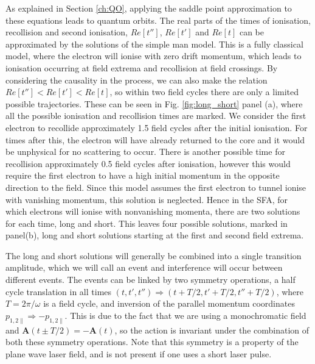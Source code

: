 \documentclass[11pt]{article}
\numberwithin{equation}{section}
\begin{document}
As explained in Section \ref{ch:QO}, applying the saddle point approximation to these equations leads to quantum orbits. The real parts of the times of ionisation, recollision and second ionisation, $Re[t'']$, $Re[t']$ and $Re[t]$ can be approximated by the solutions of the simple man model\cite{corkum_1993_plasma}. This is a fully classical model, where the electron will ionise with zero drift momentum, which leads to ionisation occurring at field extrema and recollision at field crossings. By considering the causality in the process, we can also make the relation $Re[t''] < Re[t'] < Re[t]$, so within two field cycles there are only a limited possible trajectories. These can be seen in Fig. \ref{fig:long_short} panel (a), where all the possible ionisation and recollision times are marked. We consider the first electron to recollide approximately 1.5 field cycles after the initial ionisation. For times after this, the electron will have already returned to the core and it would be unphysical for no scattering to occur. There is another possible time for recollision approximately 0.5 field cycles after ionisation, however this would require the first electron to have a high initial momentum in the opposite direction to the field. Since this model assumes the first electron to tunnel ionise with vanishing momentum, this solution is neglected. Hence in the SFA, for which electrons will ionise with nonvanishing momenta, there are two solutions for each time, long and short. This leaves four possible solutions, marked in panel(b), long and short solutions starting at the first and second field extrema. 
\par
The long and short solutions will generally be combined into a single transition amplitude, which we will call an event and interference will occur between different events. The events can be linked by two symmetry operations, a half cycle translation in all times $(t, t', t'') \Rightarrow (t+T/2, t'+T/2, t''+T/2)$, where $T = 2\pi / \omega$ is a field cycle, and inversion of the parallel momentum coordinates $p_{1,2\parallel} \Rightarrow -p_{1,2\parallel}$. This is due to the fact that we are using a monochromatic field and $\mathbf{A}(t \pm T/2) = -\mathbf{A}(t)$, so the action is invariant under the combination of both these symmetry operations. 
Note that this symmetry is a property of the plane wave laser field, and is not present if one uses a short laser pulse.
\end{document}

